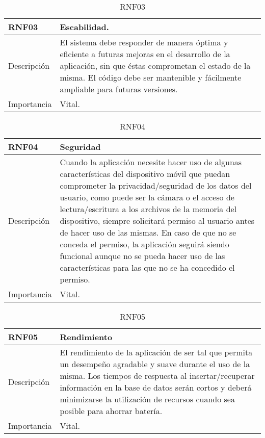 \begin{table}[H]
\label{RNF03}
\begin{center}
\begin{tabular}{| l | p{10cm} |}
\hline
RNF03 & Escabilidad.\\
\hline
Descripción & El sistema debe responder de manera óptima y eficiente a futuras mejoras en el desarrollo de la aplicación, sin que éstas comprometan el estado de la misma. El código debe ser mantenible y fácilmente ampliable para futuras versiones.\\
\hline
Importancia & Vital.\\
\hline
\end{tabular}
\end{center}
\caption{RNF03}
\end{table}

\begin{table}[H]
\label{RNF04}
\begin{center}
\begin{tabular}{| l | p{10cm} |}
\hline
RNF04 & Seguridad\\
\hline
Descripción & Cuando la aplicación necesite hacer uso de algunas características del dispositivo móvil que puedan comprometer la privacidad/seguridad de los datos del usuario, como puede ser la cámara o el acceso de lectura/escritura a los archivos de la memoria del dispositivo, siempre solicitará permiso al usuario antes de hacer uso de las mismas. En caso de que no se conceda el permiso, la aplicación seguirá siendo funcional aunque no se pueda hacer uso de las características para las que no se ha concedido el permiso.\\
\hline
Importancia & Vital.\\
\hline
\end{tabular}
\end{center}
\caption{RNF04}
\end{table} 

\begin{table}[H]
\label{RNF05}
\begin{center}
\begin{tabular}{| l | p{10cm} |}
\hline
RNF05 & Rendimiento\\
\hline
Descripción & El rendimiento de la aplicación de ser tal que permita un desempeño agradable y suave durante el uso de la misma. Los tiempos de respuesta al insertar/recuperar información en la base de datos serán cortos y deberá minimizarse la utilización de recursos cuando sea posible para ahorrar batería.\\
\hline
Importancia & Vital.\\
\hline
\end{tabular}
\end{center}
\caption{RNF05}
\end{table}

